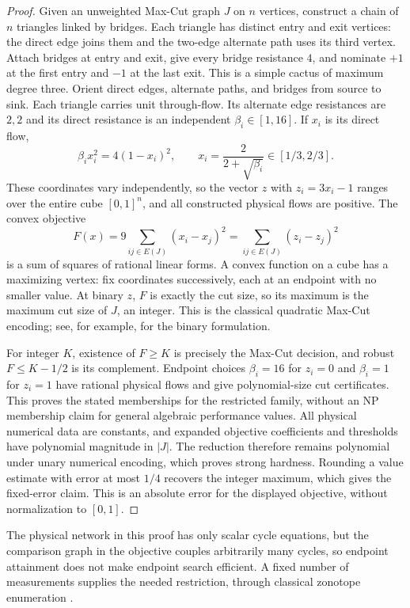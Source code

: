 \begin{proof}
Given an unweighted Max-Cut graph $J$ on $n$ vertices, construct a
chain of $n$ triangles linked by bridges.  Each triangle has distinct
entry and exit vertices: the direct edge joins them and the two-edge
alternate path uses its third vertex.  Attach bridges at entry and
exit, give every bridge resistance $4$, and nominate $+1$ at the
first entry and $-1$ at the last exit.  This is a simple cactus of
maximum degree three.  Orient direct edges, alternate paths, and
bridges from source to sink.  Each triangle carries unit through-flow.
Its alternate edge resistances are $2,2$ and its direct resistance
is an independent $\beta_i\in[1,16]$.  If $x_i$ is its direct flow,
\[
 \beta_i x_i^2=4(1-x_i)^2,
 \qquad x_i=\frac{2}{2+\sqrt{\beta_i}}\in[1/3,2/3].
\]
These coordinates vary independently, so the vector $z$ with $z_i=3x_i-1$ ranges over
the entire cube $[0,1]^n$, and all constructed physical flows are
positive.  The convex objective
\[
 F(x)=9\sum_{ij\in E(J)}(x_i-x_j)^2
          =\sum_{ij\in E(J)}(z_i-z_j)^2
\]
is a sum of squares of rational linear forms.  A convex function on
a cube has a maximizing vertex: fix coordinates successively, each at an
endpoint with no smaller value.  At binary $z$, $F$ is exactly the cut
size, so its maximum is the maximum cut size of $J$, an integer.  This
is the classical quadratic Max-Cut encoding; see, for example,
\citet[Section 1.1]{delpia2017-miqp-np} for the binary formulation.

For integer $K$, existence of $F\ge K$ is precisely the Max-Cut
decision, and robust $F\le K-1/2$ is its complement.  Endpoint
choices $\beta_i=16$ for $z_i=0$ and $\beta_i=1$ for $z_i=1$ have
rational physical flows and give polynomial-size cut certificates.
This proves the stated memberships for the restricted family, without an
NP membership claim for general algebraic performance values.
All physical numerical data are constants, and expanded objective
coefficients and thresholds have polynomial magnitude in $|J|$.
The reduction therefore remains polynomial under unary numerical
encoding, which proves strong hardness.  Rounding a value estimate with
error at most $1/4$ recovers the integer maximum, which gives the
fixed-error claim.  This is an absolute error for the displayed
objective, without normalization to $[0,1]$.
\end{proof}

The physical network in this proof has only scalar cycle equations,
but the comparison graph in the objective couples arbitrarily many
cycles, so endpoint attainment does not make endpoint search
efficient.  A fixed number of measurements supplies the needed
restriction, through classical zonotope enumeration
\citep[Lemmas 2.1--2.3 and Theorem 2.6]{onn2004-convex}.


